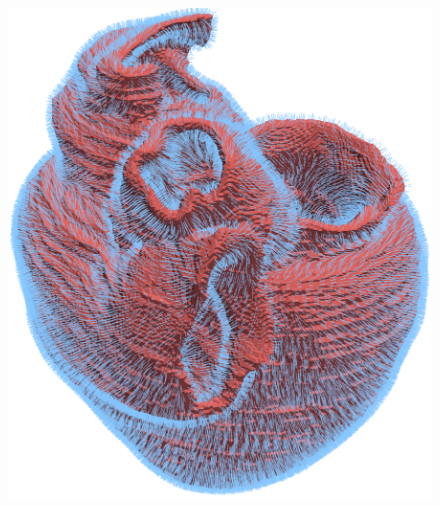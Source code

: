 \begin{figure}[ht!]
{		\includegraphics[scale=0.092]{media/2-shabaka/2-surf/2-normals.png}
\label{fig:shabakaseq2}}
\end{figure}
